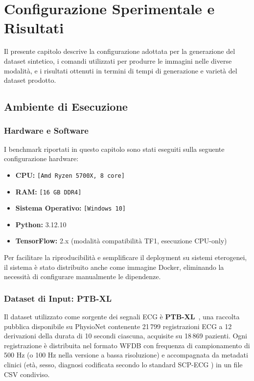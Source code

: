 \chapter{Configurazione Sperimentale e Risultati}

Il presente capitolo descrive la configurazione adottata per la generazione del dataset sintetico, i comandi utilizzati per produrre le immagini nelle diverse modalità, e i risultati ottenuti in termini di tempi di generazione e varietà del dataset prodotto.

\section{Ambiente di Esecuzione}

\subsection{Hardware e Software}

I benchmark riportati in questo capitolo sono stati eseguiti sulla seguente configurazione hardware:

\begin{itemize}
    \item \textbf{CPU:} \texttt{[Amd Ryzen 5700X, 8 core]}
    \item \textbf{RAM:} \texttt{[16 GB DDR4]}
    \item \textbf{Sistema Operativo:} \texttt{[Windows 10]}
    \item \textbf{Python:} 3.12.10
    \item \textbf{TensorFlow:} 2.x (modalità compatibilità TF1, esecuzione CPU-only)
\end{itemize}

Per facilitare la riproducibilità e semplificare il deployment su sistemi eterogenei, il sistema è stato distribuito anche come immagine Docker, eliminando la necessità di configurare manualmente le dipendenze.

\subsection{Dataset di Input: PTB-XL}

Il dataset utilizzato come sorgente dei segnali ECG è \textbf{PTB-XL}~\cite{PhysioNet-ptb-xl-1.0.3}, una raccolta pubblica disponibile su PhysioNet contenente 21\,799 registrazioni ECG a 12 derivazioni della durata di 10 secondi ciascuna, acquisite su 18\,869 pazienti. Ogni registrazione è distribuita nel formato WFDB con frequenza di campionamento di 500 Hz (o 100 Hz nella versione a bassa risoluzione) e accompagnata da metadati clinici (età, sesso, diagnosi codificata secondo lo standard SCP-ECG \cite{7868741}) in un file CSV condiviso.

